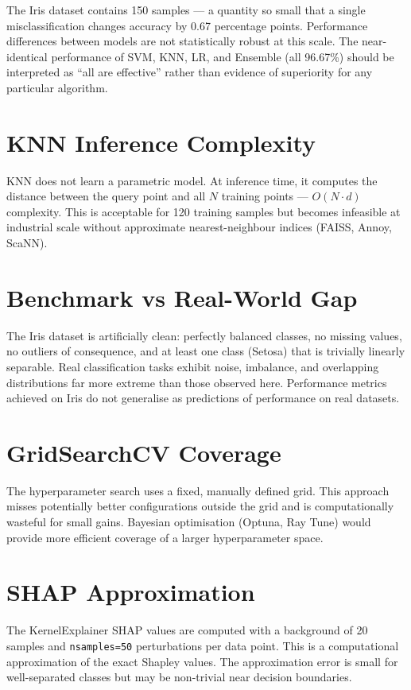 \documentclass[12pt, a4paper]{report}
\newcommand{\code}[1]{\texttt{\small\textcolor{primary}{#1}}}
\begin{document}
The Iris dataset contains 150 samples — a quantity so small that a single misclassification
changes accuracy by 0.67 percentage points. Performance differences between models are
not statistically robust at this scale. The near-identical performance of SVM, KNN, LR,
and Ensemble (all 96.67\%) should be interpreted as ``all are effective'' rather than
evidence of superiority for any particular algorithm.

\section{KNN Inference Complexity}

KNN does not learn a parametric model. At inference time, it computes the distance
between the query point and all $N$ training points — $O(N \cdot d)$ complexity. This is
acceptable for 120 training samples but becomes infeasible at industrial scale without
approximate nearest-neighbour indices (FAISS, Annoy, ScaNN).

\section{Benchmark vs Real-World Gap}

The Iris dataset is artificially clean: perfectly balanced classes, no missing values, no
outliers of consequence, and at least one class (Setosa) that is trivially linearly
separable. Real classification tasks exhibit noise, imbalance, and overlapping
distributions far more extreme than those observed here. Performance metrics achieved on
Iris do not generalise as predictions of performance on real datasets.

\section{GridSearchCV Coverage}

The hyperparameter search uses a fixed, manually defined grid. This approach misses
potentially better configurations outside the grid and is computationally wasteful for
small gains. Bayesian optimisation (Optuna, Ray Tune) would provide more efficient
coverage of a larger hyperparameter space.

\section{SHAP Approximation}

The KernelExplainer SHAP values are computed with a background of 20 samples and
\code{nsamples=50} perturbations per data point. This is a computational approximation
of the exact Shapley values. The approximation error is small for well-separated classes
but may be non-trivial near decision boundaries.
\end{document}
